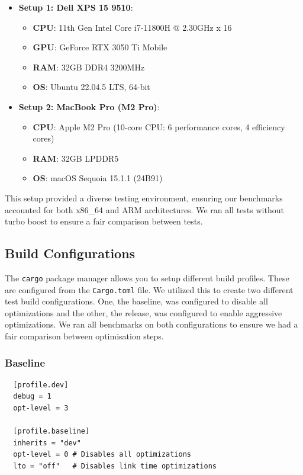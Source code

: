 \documentclass[twoside,11pt]{report}
\theoremstyle{definition}
\theoremstyle{plain}
\begin{document}
\begin{itemize}
  \item \textbf{Setup 1: Dell XPS 15 9510}:
        \begin{itemize}
          \item \textbf{CPU}: 11th Gen Intel Core i7-11800H @ 2.30GHz x 16
          \item \textbf{GPU}: GeForce RTX 3050 Ti Mobile
          \item \textbf{RAM}: 32GB DDR4 3200MHz
          \item \textbf{OS}: Ubuntu 22.04.5 LTS, 64-bit
        \end{itemize}
  \item \textbf{Setup 2: MacBook Pro (M2 Pro)}:
        \begin{itemize}
          \item \textbf{CPU}: Apple M2 Pro (10-core CPU: 6 performance cores, 4 efficiency cores)
          \item \textbf{RAM}: 32GB LPDDR5
          \item \textbf{OS}: macOS Sequoia 15.1.1 (24B91)
        \end{itemize}
\end{itemize}
This setup provided a diverse testing environment, ensuring our benchmarks accounted for both x86\_64 and ARM architectures. We ran all tests without turbo boost to ensure a fair comparison between tests.

\subsection{Build Configurations}\label{sub:build_config}

The \texttt{cargo} package manager allows you to setup different build profiles. These are configured from the \texttt{Cargo.toml} file. We utilized this to create two different test build configurations. One, the baseline, was configured to disable all optimizations and the other, the release, was configured to enable aggressive optimizations. We ran all benchmarks on both configurations to ensure we had a fair comparison between optimisation steps.

\subsubsection*{Baseline}
\begin{verbatim}
  [profile.dev]
  debug = 1
  opt-level = 3

  [profile.baseline]
  inherits = "dev"
  opt-level = 0 # Disables all optimizations
  lto = "off"   # Disables link time optimizations
\end{verbatim}
\end{document}
